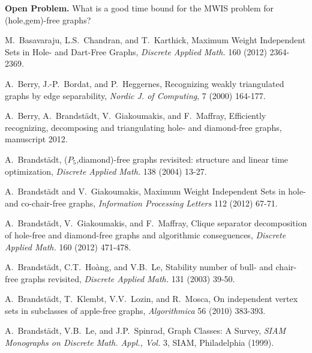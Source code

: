 \documentclass[11pt]{article}
\newcommand{\0}{\text{ has a co-join to }}
\newcommand{\1}{\text{ has a join to }}
\begin{document}
\medskip

\noindent
{\bf Open Problem.} What is a good time bound for the MWIS problem for (hole,gem)-free graphs?




\begin{footnotesize}
\renewcommand{\baselinestretch}{0.4}

\begin{thebibliography}{99}

    M.~Basavaraju, L.S.~Chandran, and T.~Karthick,
    Maximum Weight Independent Sets in Hole- and Dart-Free Graphs,
    {\sl Discrete Applied Math.} 160 (2012) 2364-2369.

    A.~Berry, J.-P.~Bordat, and P.~Heggernes, 
    Recognizing weakly triangulated graphs by edge separability,  
    {\em Nordic J. of Computing}, 7 (2000) 164-177.

    A.~Berry, A.~Brandst\"adt, V.~Giakoumakis, and F.~Maffray, 
    Efficiently recognizing, decomposing and triangulating hole- and diamond-free graphs,
    manuscript 2012.
    
    A.~Brandst\"adt, 
    ($P_5$,diamond)-free graphs revisited: structure and linear time optimization,
    {\sl Discrete Applied Math.} 138 (2004) 13-27.
    
    A.~Brandst\"adt and V.~Giakoumakis,
    Maximum Weight Independent Sets in hole- and co-chair-free graphs,
    {\sl Information Processing Letters} 112 (2012) 67-71.

    A.~Brandst\"adt, V.~Giakoumakis, and F.~Maffray, 
    Clique separator decomposition of hole-free and diamond-free graphs and algorithmic conseguences,
    {\sl Discrete Applied Math.} 160 (2012) 471-478.

    A.~Brandst\"adt, C.T.~Ho\`ang, and V.B.~Le, 
    Stability number of bull- and chair-free graphs revisited,
    {\sl Discrete Applied Math.} 131 (2003) 39-50.

    A.~Brandst\"adt, T.~Klembt, V.V.~Lozin, and R.~Mosca,
    On independent vertex sets in subclasses of apple-free graphs,
    {\sl Algorithmica} 56 (2010) 383-393.

    A.~Brandst\"adt, V.B.~Le, and J.P.~Spinrad,
    Graph Classes: A Survey,
    {\sl SIAM Monographs on Discrete Math. Appl., Vol.} 3,
    SIAM, Philadelphia (1999).


\end{thebibliography}
\end{footnotesize}
\end{document}

